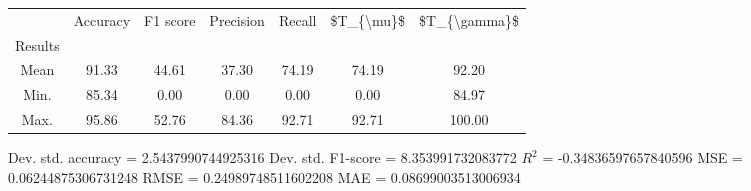 \begin{tabular}{|c|c|c|c|c|c|c|}
\toprule
{} &  Accuracy &  F1 score &  Precision &  Recall &  \$T\_\{\textbackslash mu\}\$ &  \$T\_\{\textbackslash gamma\}\$ \\
Results &           &           &            &         &            &               \\
\hline
Mean    &     91.33 &     44.61 &      37.30 &   74.19 &      74.19 &         92.20 \\
Min.    &     85.34 &      0.00 &       0.00 &    0.00 &       0.00 &         84.97 \\
Max.    &     95.86 &     52.76 &      84.36 &   92.71 &      92.71 &        100.00 \\
\bottomrule
\end{tabular}

 Dev. std. accuracy = 2.5437990744925316
 Dev. std. F1-score = 8.353991732083772
 $R^2$ = -0.34836597657840596
 MSE = 0.06244875306731248
 RMSE = 0.24989748511602208
 MAE = 0.08699003513006934